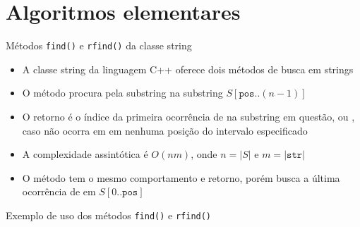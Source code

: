 \section{Algoritmos elementares}

\begin{frame}[fragile]{Métodos {\tt find()} e {\tt rfind()} da classe string}

    \begin{itemize}
        \item A classe string da linguagem C++ oferece dois métodos de busca em strings

        \item O método  procura pela substring  na 
            substring $S[\mathtt{pos}..(n - 1)]$
        \vspace{.1in}
        \vspace{.1in}

        \item O retorno é o índice da primeira ocorrência de  na substring em
            questão, ou , caso  não ocorra em
            em nenhuma posição do intervalo especificado

        \item A complexidade assintótica é $O(nm)$, onde $n = |S|$ e $m = |\mathtt{str}|$

        \item O método  tem o mesmo comportamento e retorno, porém busca
            a última ocorrência de  em $S[0..\mathtt{pos}]$

        \vspace{.1in}
        \vspace{.1in}
    \end{itemize}

\end{frame}

\begin{frame}[fragile]{Exemplo de uso dos métodos {\tt find()} e {\tt rfind()}}
\end{frame}

